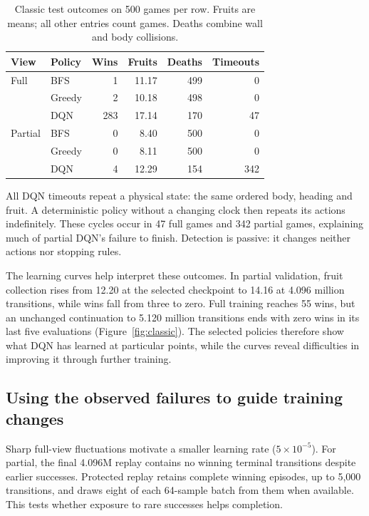 \documentclass{article}
\begin{document}
\begin{table}[ht]
\caption{Classic test outcomes on 500 games per row. Fruits are means; all other entries count games. Deaths combine wall and body collisions.}
\label{tab:classic}
\centering
\begin{small}
\begin{tabular}{llrrrr}
\toprule
View & Policy & Wins & Fruits & Deaths & Timeouts \\
\midrule
Full & BFS & 1 & 11.17 & 499 & 0 \\
 & Greedy & 2 & 10.18 & 498 & 0 \\
 & DQN & 283 & 17.14 & 170 & 47 \\
Partial & BFS & 0 & 8.40 & 500 & 0 \\
 & Greedy & 0 & 8.11 & 500 & 0 \\
 & DQN & 4 & 12.29 & 154 & 342 \\
\bottomrule
\end{tabular}
\end{small}
\end{table}

\begin{samepage}
All DQN timeouts repeat a physical state: the same ordered body, heading and fruit. A deterministic policy without a changing clock then repeats its actions indefinitely. These cycles occur in 47 full games and 342 partial games, explaining much of partial DQN's failure to finish. Detection is passive: it changes neither actions nor stopping rules.\par
\end{samepage}

\begin{samepage}
The learning curves help interpret these outcomes. In partial validation, fruit collection rises from 12.20 at the selected checkpoint to 14.16 at 4.096 million transitions, while wins fall from three to zero. Full training reaches 55 wins, but an unchanged continuation to 5.120 million transitions ends with zero wins in its last five evaluations (Figure~\ref{fig:classic}). The selected policies therefore show what DQN has learned at particular points, while the curves reveal difficulties in improving it through further training.\par
\end{samepage}

\subsection{Using the observed failures to guide training changes}
Sharp full-view fluctuations motivate a smaller learning rate ($5\times10^{-5}$). For partial, the final 4.096M replay contains no winning terminal transitions despite earlier successes. Protected replay retains complete winning episodes, up to 5,000 transitions, and draws eight of each 64-sample batch from them when available. This tests whether exposure to rare successes helps completion.
\end{document}
